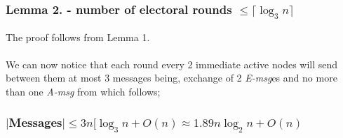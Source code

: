 \documentclass{article}
\begin{document}
\subsubsection*{Lemma 2. - number of electoral rounds $\leq \lceil\log_{3}n\rceil$}
The proof follows from Lemma 1.\\
\\
We can now notice that each round every 2 immediate active nodes will send between them at most 3 messages being, exchange of 2 \textit{E-msg}es and no more than one \textit{A-msg} from which follows;
\subsubsection*{$|$Messages$|\leq 3n[\log_{3}n+O(n)\approx 1.89n \log_{2}n+O(n)$}

 
\end{document}
